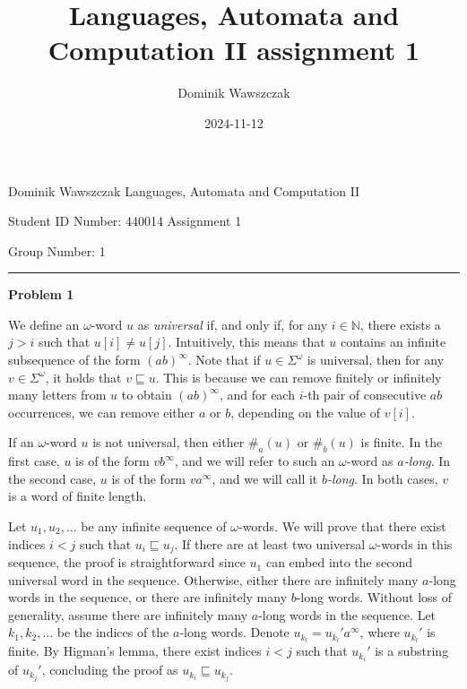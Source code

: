 \documentclass[12pt]{article}
\title{Languages, Automata and Computation II assignment 1}
\author{Dominik Wawszczak}
\date{2024-11-12}
\begin{document}
	\setlength{\parindent}{0 cm}
	
	Dominik Wawszczak \hfill Languages, Automata and Computation II
	
	Student ID Number: 440014 \hfill Assignment 1
	
	Group Number: 1
	
	\bigskip
	\hrule
	\bigskip
	
	\textbf{Problem 1}
	
	\medskip
	
	We define an \(\omega\)-word \(u\) as \textit{universal} if, and only if,
	for any \(i \in \mathbb{N}\), there exists a \(j > i\) such that \(u[i] \neq
	u[j]\). Intuitively, this means that \(u\) contains an infinite subsequence
	of the form \((ab)^{\infty}\). Note that if \(u \in \Sigma^{\omega}\) is
	universal, then for any \(v \in \Sigma^{\omega}\), it holds that \(v
	\sqsubseteq u\). This is because we can remove finitely or infinitely many
	letters from \(u\) to obtain \((ab)^{\infty}\), and for each \(i\)-th pair
	of consecutive \(ab\) occurrences, we can remove either \(a\) or \(b\),
	depending on the value of \(v[i]\).
	
	\medskip
	
	If an \(\omega\)-word \(u\) is not universal, then either \(\#_{a}(u)\) or
	\(\#_{b}(u)\) is finite. In the first case, \(u\) is of the form
	\(vb^{\infty}\), and we will refer to such an \(\omega\)-word as
	\textit{\(a\)-long}. In the second case, \(u\) is of the form
	\(va^{\infty}\), and we will call it \textit{\(b\)-long}. In both cases,
	\(v\) is a word of finite length.
	
	\medskip
	
	Let \(u_{1}, u_{2}, \ldots\) be any infinite sequence of \(\omega\)-words.
	We will prove that there exist indices \(i < j\) such that \(u_{i}
	\sqsubseteq u_{j}\). If there are at least two universal \(\omega\)-words in
	this sequence, the proof is straightforward since \(u_{1}\) can embed into
	the second universal word in the sequence. Otherwise, either there are
	infinitely many \(a\)-long words in the sequence, or there are infinitely
	many \(b\)-long words. Without loss of generality, assume there are
	infinitely many \(a\)-long words in the sequence. Let \(k_{1}, k_{2},
	\ldots\) be the indices of the \(a\)-long words. Denote \(u_{k_{l}} =
	u_{k_{l}}'a^{\infty}\), where \(u_{k_{l}}'\) is finite. By Higman's lemma,
	there exist indices \(i < j\) such that \(u_{k_{i}}'\) is a substring of
	\(u_{k_{j}}'\), concluding the proof as \(u_{k_{i}} \sqsubseteq u_{k_{j}}\).
\end{document}
